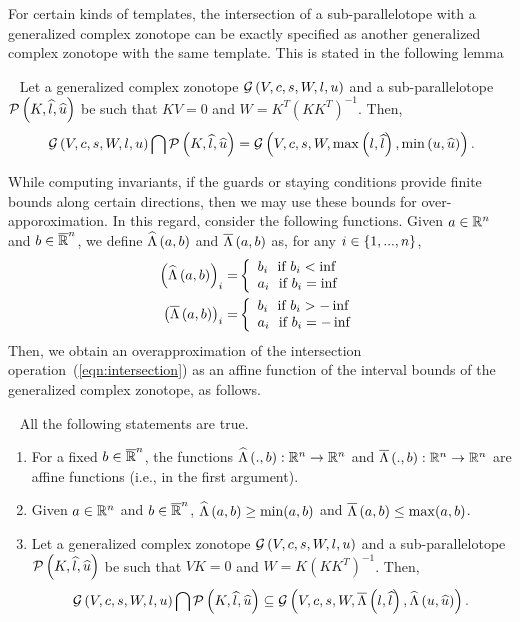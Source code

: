 For certain kinds of templates, the intersection of a
sub-parallelotope with a generalized complex zonotope can be exactly
specified as another generalized complex zonotope with the same
template.  This is stated in the following lemma 
\begin{lemma}~\label{lem:intersection}
  Let a generalized complex zonotope $\mathcal{G}\left(V,c,s,W,l,u\right)$ and a sub-parallelotope
  $\mathcal{P}\left(K,\widehat{l},\widehat{u}\right)$ be such that $KV=0$ and
  $W=K^T(KK^T)^{-1}$.  Then, 
\begin{equation}~\label{eqn:intersection}
\mathcal{G}\left(V,c,s,W,l,u\right)\bigcap \mathcal{P}\left(K,\widehat{l},\widehat{u}\right) =
  \mathcal{G}\left(V,c,s,W,\max\left(l,\widehat{l}\right),\min\left(u,\widehat{u}\right)\right).
\end{equation}
\end{lemma}

While computing invariants, if the guards or staying conditions
provide finite bounds along certain directions, then we may use these
bounds for over-apporoximation.  In this regard, consider the
following functions.  Given $a\in\mathbb{R}^n$ and $b\in\mathbb{\overline{R}}^n$,
we define $\widehat{\Lambda}\left(a,b\right)$ and $\overline{\Lambda}\left(a,b\right)$ as, for any
$i\in\{1,...,n\}$,
\begin{align}
\left(\widehat{\Lambda}\left(a,b\right)\right)_i= & \left\{
\begin{array}{l}
b_i~~\text{if}~b_i<\inf\\
a_i~~\text{if}~b_i=\inf
\end{array}
\right.\\
\left(\overline{\Lambda}\left(a,b\right)\right)_i= &\left\{
\begin{array}{l}
b_i~~\text{if}~b_i>-\inf\\
a_i~~\text{if}~b_i=-\inf
\end{array}
\right.
\end{align}
%
Then, we obtain an overapproximation of the intersection
operation~(\ref{eqn:intersection}) as an affine function of the
interval bounds of the generalized complex zonotope, as follows.
\begin{lemma}~\label{lem:affineapproximation}
All the following statements are true.
\begin{enumerate}
\item For a fixed $b\in\mathbb{\overline{R}}^n$, the functions
  $\widehat{\Lambda}\left(.,b\right):\mathbb{R}^n\rightarrow\mathbb{R}^n$ and
  $\overline{\Lambda}\left(.,b\right):\mathbb{R}^n\rightarrow\mathbb{R}^n$ are affine functions
  (i.e., in
  the first argument).
\item Given $a\in\mathbb{R}^n$ and $b\in\mathbb{\overline{R}}^n$,
  $\widehat{\Lambda}\left(a,b\right)\geq \min(a,b)$ and $\overline{\Lambda}\left(a,b\right)\leq
  \max(a,b)$.
\item Let a generalized complex zonotope $\mathcal{G}\left(V,c,s,W,l,u\right)$ and a sub-parallelotope
  $\mathcal{P}\left(K,\widehat{l},\widehat{u}\right)$ be such that $VK=0$ and
  $W=K(KK^T)^{-1}$.  Then, \[\mathcal{G}\left(V,c,s,W,l,u\right)\bigcap \mathcal{P}\left(K,\widehat{l},\widehat{u}\right) \subseteq
  \mathcal{G}\left(V,c,s,W,\overline{\Lambda}\left(l,\widehat{l}\right),\widehat{\Lambda}\left(u,\widehat{u}\right)\right).\]
\end{enumerate}
\end{lemma}



